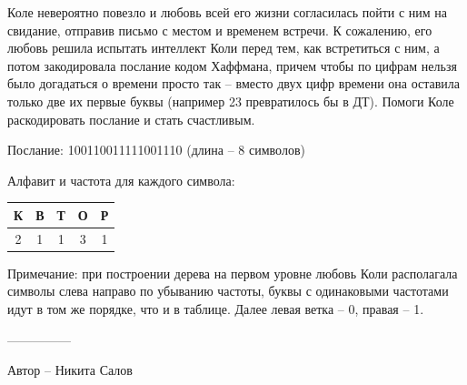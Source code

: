 \question
Коле невероятно повезло и любовь всей его жизни согласилась пойти с ним на свидание, отправив письмо с местом и временем встречи. К сожалению, его любовь решила испытать интеллект Коли перед тем, как встретиться с ним, а потом закодировала послание кодом Хаффмана, причем чтобы по цифрам нельзя было догадаться о времени просто так – вместо двух цифр времени она оставила только две их первые буквы (например 23 превратилось бы в ДТ). Помоги Коле раскодировать послание и стать счастливым.

Послание: 100110011111001110 (длина – 8 символов)

Алфавит и частота для каждого символа:
\begin{center}
\begin{tabular}{|c|c|c|c|c|}
\hline
К& В& Т& О &Р\\
\hline
2& 1& 1& 3&1\\ \hline
\end{tabular}
\end{center}

Примечание: при построении дерева на первом уровне любовь Коли располагала символы слева направо по убыванию частоты, буквы с одинаковыми частотами идут в том же порядке, что и в таблице. Далее левая ветка – 0, правая – 1.

---------------

Автор -- Никита Салов